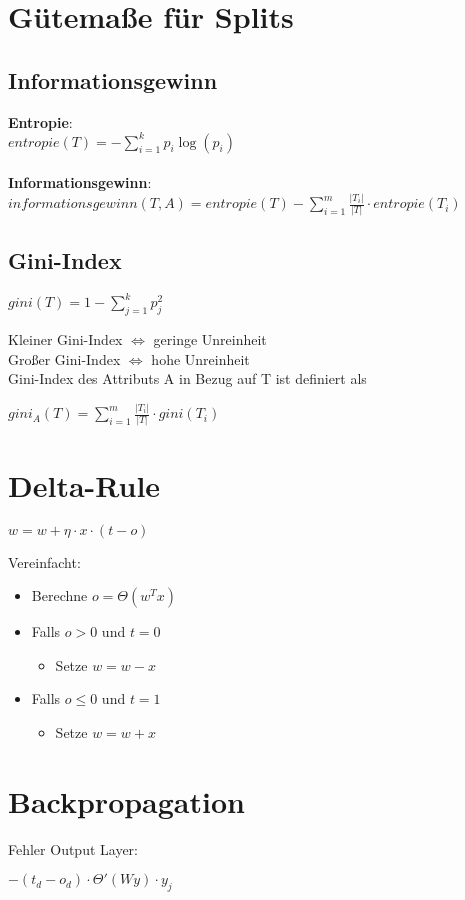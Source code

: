 \documentclass{article}
\begin{document}
\section{Gütemaße für Splits}
\subsection{Informationsgewinn}
\textbf{Entropie}: \\
$entropie(T) = - \sum_{i = 1}^{k} p_i \log(p_i)$ \\
\\
\textbf{Informationsgewinn}: \\
$informationsgewinn(T, A) = entropie(T) -
\sum_{i = 1}^{m} \frac{|T_i|}{|T|} \cdot entropie(T_i)$
\subsection{Gini-Index}
\begin{center}
    $gini(T) = 1 - \sum_{j = 1}^k p_j^2$
\end{center}
Kleiner Gini-Index $\Leftrightarrow$ geringe Unreinheit \\
Großer Gini-Index $\Leftrightarrow$ hohe Unreinheit \\
Gini-Index des Attributs A in Bezug auf T ist definiert als
\begin{center}
    $gini_A(T) = \sum_{i = 1}^m \frac{|T_i|}{|T|} \cdot gini(T_i)$
\end{center}
\section{Delta-Rule}
\begin{center}
    $w = w + \eta \cdot x \cdot (t - o)$
\end{center}
Vereinfacht: \\
\begin{itemize}
    \item Berechne $o = \Theta(w^T x)$
    \item Falls $o > 0$ und $t = 0$
    \begin{itemize}
        \item Setze $w = w - x$
    \end{itemize}
    \item Falls $o \leq 0$ und $t = 1$
    \begin{itemize}
        \item Setze $w = w + x$
    \end{itemize}
\end{itemize}
\section{Backpropagation}
Fehler Output Layer:
\begin{center}
    $-(t_d - o_d) \cdot \Theta'(W y) \cdot y_j$
\end{center}
\end{document}
